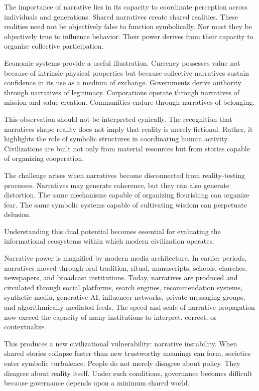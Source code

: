 \documentclass[12pt]{article}
\begin{document}
The importance of narrative lies in its capacity to coordinate perception across individuals and generations. Shared narratives create shared realities. These realities need not be objectively false to function symbolically. Nor must they be objectively true to influence behavior. Their power derives from their capacity to organize collective participation.

Economic systems provide a useful illustration. Currency possesses value not because of intrinsic physical properties but because collective narratives sustain confidence in its use as a medium of exchange. Governments derive authority through narratives of legitimacy. Corporations operate through narratives of mission and value creation. Communities endure through narratives of belonging.

This observation should not be interpreted cynically. The recognition that narratives shape reality does not imply that reality is merely fictional. Rather, it highlights the role of symbolic structures in coordinating human activity. Civilizations are built not only from material resources but from stories capable of organizing cooperation.

The challenge arises when narratives become disconnected from reality-testing processes. Narratives may generate coherence, but they can also generate distortion. The same mechanisms capable of organizing flourishing can organize fear. The same symbolic systems capable of cultivating wisdom can perpetuate delusion.

Understanding this dual potential becomes essential for evaluating the informational ecosystems within which modern civilization operates.

Narrative power is magnified by modern media architecture. In earlier periods, narratives moved through oral tradition, ritual, manuscripts, schools, churches, newspapers, and broadcast institutions. Today, narratives are produced and circulated through social platforms, search engines, recommendation systems, synthetic media, generative AI, influencer networks, private messaging groups, and algorithmically mediated feeds. The speed and scale of narrative propagation now exceed the capacity of many institutions to interpret, correct, or contextualize.

This produces a new civilizational vulnerability: narrative instability. When shared stories collapse faster than new trustworthy meanings can form, societies enter symbolic turbulence. People do not merely disagree about policy. They disagree about reality itself. Under such conditions, governance becomes difficult because governance depends upon a minimum shared world.
\end{document}
